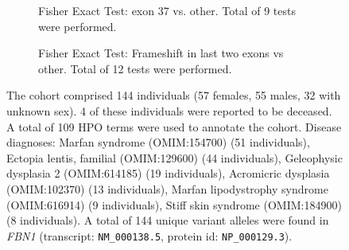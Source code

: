 \begin{figure}[htbp]
\begin{subfigure}[b]{0.95\textwidth}
\centering
{}
\captionsetup{justification=raggedright,singlelinecheck=false}
\caption{Fisher Exact Test:  exon 37 vs. other. Total of  9 tests were performed. }
\end{subfigure}
\begin{subfigure}[b]{0.95\textwidth}
\centering
{}
\captionsetup{justification=raggedright,singlelinecheck=false}
\caption{Fisher Exact Test: Frameshift in last two exons vs other. Total of  12 tests were performed. }
\end{subfigure}
\caption{The cohort comprised 144 individuals (57 females, 55 males, 32 with unknown sex). 4 of these individuals were reported to be deceased. A total of 109 HPO terms were used to annotate the cohort. Disease diagnoses: Marfan syndrome (OMIM:154700) (51 individuals), Ectopia lentis, familial (OMIM:129600) (44 individuals), Geleophysic dysplasia 2 (OMIM:614185) (19 individuals), Acromicric dysplasia (OMIM:102370) (13 individuals), Marfan lipodystrophy syndrome (OMIM:616914) (9 individuals), Stiff skin syndrome (OMIM:184900) (8 individuals).  A total of 144 unique variant alleles were found in \textit{FBN1} (transcript: \texttt{NM\_000138.5}, protein id: \texttt{NP\_000129.3}).}
\end{figure}
